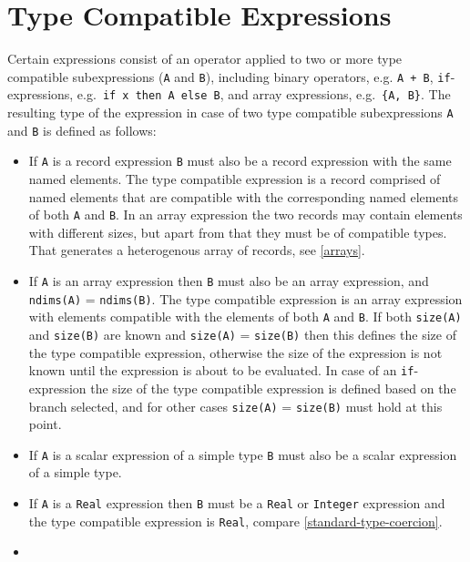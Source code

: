 \section{Type Compatible Expressions}\label{type-compatible-expressions}

Certain expressions consist of an operator applied to two or more type compatible subexpressions (\lstinline!A! and \lstinline!B!), including binary operators, e.g. \lstinline!A + B!, \lstinline!if!-expressions, e.g.\ \lstinline!if x then A else B!, and array expressions, e.g.\ \lstinline!{A, B}!.
The resulting type of the expression in case of two type compatible subexpressions \lstinline!A! and \lstinline!B! is defined as follows:
\begin{itemize}
\item
  If \lstinline!A! is a record expression \lstinline!B! must also be a record expression with the same named elements. The type compatible expression is a record comprised of named elements that are compatible with the corresponding named elements of both \lstinline!A! and \lstinline!B!.
  In an array expression the two records may contain elements with different sizes, but apart from that they must be of compatible types.
  That generates a heterogenous array of records, see \cref{arrays}.
\item
  If \lstinline!A! is an array expression then \lstinline!B! must also be an array expression, and \lstinline!ndims(A)! = \lstinline!ndims(B)!.
  The type compatible expression is an array expression with elements compatible with the elements of both \lstinline!A! and \lstinline!B!.
  If both \lstinline!size(A)! and \lstinline!size(B)! are known and \lstinline!size(A)! = \lstinline!size(B)! then this defines the size of the type compatible expression, otherwise the size of the expression is not known until the expression is about to be evaluated.
  In case of an \lstinline!if!-expression the size of the type compatible expression is defined based on the branch selected, and for other cases \lstinline!size(A)! = \lstinline!size(B)! must hold at this point.
\item
  If \lstinline!A! is a scalar expression of a simple type \lstinline!B! must also be a scalar
  expression of a simple type.
\item
  If \lstinline!A! is a \lstinline!Real! expression then \lstinline!B! must be a \lstinline!Real! or \lstinline!Integer! expression
  and the type compatible expression is \lstinline!Real!, compare \cref{standard-type-coercion}.
\item

\end{itemize}
